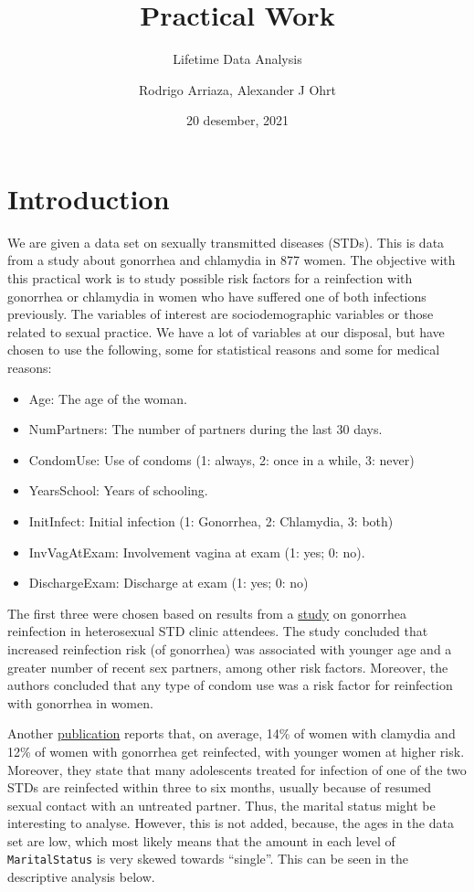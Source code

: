 \documentclass[
]{article}
\title{Practical Work}
\subtitle{Lifetime Data Analysis}
\author{Rodrigo Arriaza, Alexander J Ohrt}
\date{20 desember, 2021}
\providecommand{\tightlist}{%
  \setlength{\itemsep}{0pt}\setlength{\parskip}{0pt}}
\begin{document}
\maketitle

\hypertarget{introduction}{%
\section{Introduction}\label{introduction}}

We are given a data set on sexually transmitted diseases (STDs). This is data from a study about gonorrhea and chlamydia in 877 women. The objective with this practical work is to study possible risk factors for a reinfection with gonorrhea or chlamydia in women who have suffered one of both infections previously. The variables of interest are sociodemographic variables or those related to sexual practice. We have a lot of variables at our disposal, but have chosen to use the following, some for statistical reasons and some for medical reasons:

\begin{itemize}
\tightlist
\item
  Age: The age of the woman.
\item
  NumPartners: The number of partners during the last 30 days.
\item
  CondomUse: Use of condoms (1: always, 2: once in a while, 3: never)
\item
  YearsSchool: Years of schooling.
\item
  InitInfect: Initial infection (1: Gonorrhea, 2: Chlamydia, 3: both)
\item
  InvVagAtExam: Involvement vagina at exam (1: yes; 0: no).
\item
  DischargeExam: Discharge at exam (1: yes; 0: no)
\end{itemize}

The first three were chosen based on results from a \href{https://www.ncbi.nlm.nih.gov/pmc/articles/PMC1744639/}{study} on gonorrhea reinfection in heterosexual STD clinic attendees. The study concluded that increased reinfection risk (of gonorrhea) was associated with younger age and a greater number of recent sex partners, among other risk factors. Moreover, the authors concluded that any type of condom use was a risk factor for reinfection with gonorrhea in women.

Another \href{https://policylab.chop.edu/sites/default/files/pdf/publications/Preventing_Chlamydia_Gonorrhea_Reinfection_through_Increased_Use_of_EPT.pdf}{publication} reports that, on average, 14\% of women with clamydia and 12\% of women with gonorrhea get reinfected, with younger women at higher risk. Moreover, they state that many adolescents treated for infection of one of the two STDs are reinfected within three to six months, usually because of resumed sexual contact with an untreated partner. Thus, the marital status might be interesting to analyse. However, this is not added, because, the ages in the data set are low, which most likely means that the amount in each level of \texttt{MaritalStatus} is very skewed towards ``single''. This can be seen in the descriptive analysis below.
\end{document}
